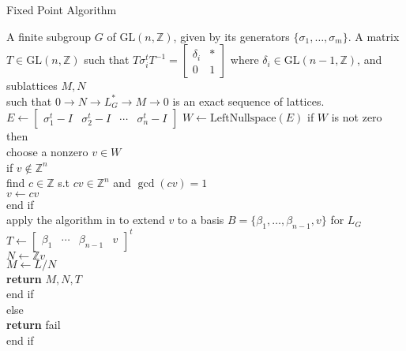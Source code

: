 \documentclass{article}
\theoremstyle{plain}
\theoremstyle{definition}
\newcommand{\Z}{\ensuremath{\mathbb{Z}}}
\begin{document}
\begin{algorithm}[H]
	\caption{Fixed Point Algorithm}
	\label{alg:Fixed Point}
	\begin{algorithmic}[1]
		\REQUIRE A finite subgroup $G$ of $\mathrm{GL}(n,\Z)$, given by its generators $\lbrace \sigma_1, \ldots , \sigma_m \rbrace$.
		\ENSURE A matrix $T \in \mathrm{GL}(n,\Z)$ such that $T \sigma^t_i T^{-1}= \left[ \begin{array}{c|c}
		\delta_i & \ast \\
		\hline 
		0 &1
		\end{array} \right]
		$ where $\delta_i \in \mathrm{GL}(n-1,\Z)$, and sublattices $M, N$ \\
		\hspace{0.8cm}such that $0\longrightarrow N \longrightarrow L^*_G \longrightarrow M \longrightarrow 0$ 
		is an exact sequence of lattices.
		\bigskip
		\STATE $E \gets \left[ \begin{array}{c|c|c|c}
		\sigma^t_1-I & \sigma^t_2 -I & \cdots & \sigma^t_n -I
		\end{array} \right]$
	    \STATE $W \gets \mathrm{LeftNullspace}(E)$
	    \STATE if $W $ is not zero then\\
	    \hspace{0.5in} choose a nonzero $v \in W$\\
	    \hspace{0.5 in} if $v \notin \Z^n$ \\
	    \hspace{1in} find $c \in \Z$ s.t $cv \in \Z^n$ and $\gcd(cv) = 1$\\
	    \hspace{1in} $v \gets cv$\\
	    \hspace{0.5 in} end if\\
	    \hspace{0.5in} apply the algorithm in \cite{LatticeBase} to extend $v$ to a basis $B = \lbrace \beta_1, \ldots, \beta_{n-1},v\rbrace$ for $L_G$\\
	    \hspace{0.5in} $T \gets \begin{bmatrix}
	    \beta_1 &  \cdots &  \beta_{n-1}& v
	    \end{bmatrix}^t$\\
		\hspace{0.5in} $N \gets \Z v$\\
		\hspace{0.5in} $M \gets L/N$\\
		\hspace{0.5in} \textbf{return} $M,N, T$\\
	  \hspace{0.5in} end if\\
	  else\\
	     \hspace{0.5in}  \textbf{return} fail\\
	     end if
	 	\end{algorithmic}
\end{algorithm}
\end{document}

